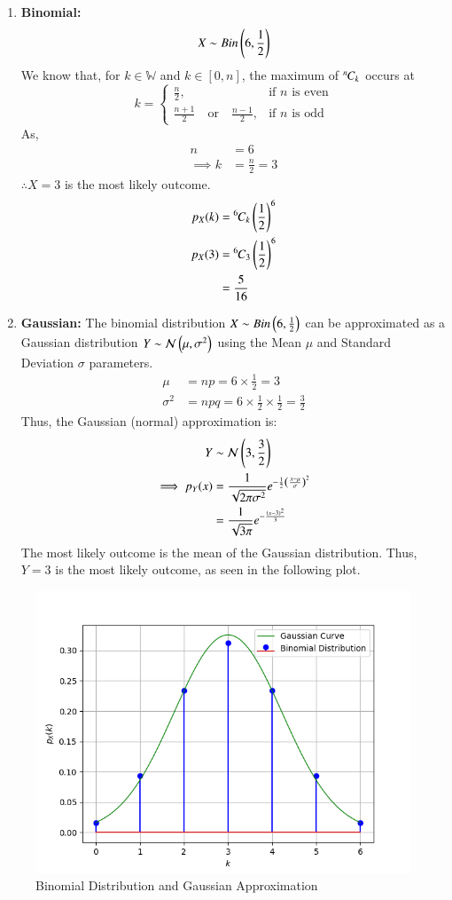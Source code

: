 \documentclass[journal,12pt,twocolumn]{IEEEtran}
\theoremstyle{remark}
\begin{document}
\begin{enumerate}
\item \textbf{Binomial:}
\begin{align}
    X \sim Bin\left(6,\frac{1}{2}\right) 
\end{align}
We know that, for $k \in \mathbb{W}$ and $k \in [0,n]$, the maximum of ${{}^{n}\mkern-1muC_{k}}$ occurs at
\begin{equation}
    k =
    \begin{cases}
        \frac{n}{2}, & \text{if } n \text{ is even} \\
        \frac{n+1}{2} \quad \text{or} \quad \frac{n-1}{2}, & \text{if } n \text{ is odd} 
    \end{cases}
\end{equation}
As, 
\begin{align}
   	n&=6\\
   	\implies k&=\frac{n}{2}
   	=3
\end{align}
$\therefore X = 3$ is the most likely outcome.
\begin{align}
    p_X(k) &= {{}^{6}\mkern-1muC_{k}} \left(\frac{1}{2}\right)^6 \\
    p_X(3) &= {{}^{6}\mkern-1muC_{3}} \left(\frac{1}{2}\right)^6 \\
    &= \frac{5}{16}
\end{align}
\item \textbf{Gaussian:}
The binomial distribution $X \sim Bin\left(6,\frac{1}{2}\right)$ can be approximated as a Gaussian distribution $Y \sim \mathcal{N}\left(\mu, \sigma^2\right)$ using the Mean $\mu$ and Standard Deviation $\sigma$ parameters.
\begin{align}
    \mu &= np = 6 \times \frac{1}{2} = 3\\
    \sigma^2 &= npq = 6 \times \frac{1}{2} \times \frac{1}{2} = \frac{3}{2}
\end{align}
Thus, the Gaussian (normal) approximation is:
\begin{align}
    Y &\sim \mathcal{N}\left(3, \frac{3}{2}\right)\\
    \implies p_Y(x) &= \frac{1}{\sqrt{2\pi\sigma^2}}e^{-\frac{1}{2} \left(\frac{x - \mu}{\sigma}\right)^2}\\
    &= \frac{1}{\sqrt{3\pi}}e^{-\frac{\left(x - 3\right)^2}{3}}
\end{align}
The most likely outcome is the mean of the Gaussian distribution. Thus, $Y = 3$ is the most likely outcome, as seen in the following plot.
\end{enumerate}
\begin{figure}[h]
\centering
\includegraphics[width=\columnwidth]{figures/PDF_and_PMF.png}
\caption{Binomial Distribution and Gaussian Approximation}
\label{fig:9.3.19}
\end{figure}
\end{document}
